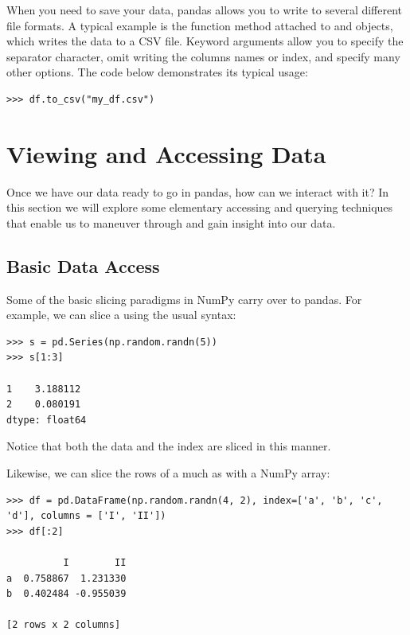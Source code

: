 When you need to save your data, pandas allows you to write to several different file formats.
A typical example is the  function method attached to  and  objects,
which writes the data to a CSV file.
Keyword arguments allow you to specify the separator character, omit writing the columns names or index,
and specify many other options. The code below demonstrates its typical usage:
\begin{lstlisting}
>>> df.to_csv("my_df.csv")
\end{lstlisting}

\section*{Viewing and Accessing Data}

Once we have our data ready to go in pandas, how can we interact with it?
In this section we will explore some elementary accessing and querying techniques that enable us to maneuver through and gain insight into our data.

\subsection*{Basic Data Access}
Some of the basic slicing paradigms in NumPy carry over to pandas. 
For example, we can slice a  using the usual syntax:
\begin{lstlisting}
>>> s = pd.Series(np.random.randn(5))
>>> s[1:3]

1    3.188112
2    0.080191
dtype: float64
\end{lstlisting}
Notice that both the data and the index are sliced in this manner.

Likewise, we can slice the rows of a  much as with a NumPy array:
\begin{lstlisting}
>>> df = pd.DataFrame(np.random.randn(4, 2), index=['a', 'b', 'c', 'd'], columns = ['I', 'II'])
>>> df[:2]

          I        II
a  0.758867  1.231330
b  0.402484 -0.955039

[2 rows x 2 columns]
\end{lstlisting}

